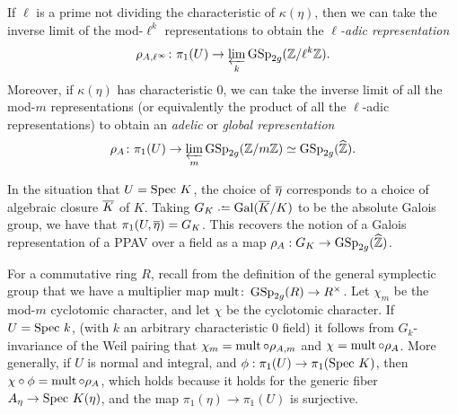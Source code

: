 If $\ell$ is a prime not dividing the characteristic of $\kappa(\eta)$, then we can take the inverse limit of the mod-$\ell^k$ representations to obtain the \emph{$\ell$-adic representation}
\begin{equation}\label{itsladicguys}
\rho_{A,\ell^\infty} \colon \pi_1(U) \to \varprojlim_k{\operatorname{GSp}_{2g}(\mathbb Z/\ell^k \mathbb Z)}.
\end{equation}
Moreover, if $\kappa(\eta)$ has characteristic $0$, we can take the inverse limit of all the mod-$m$ representations (or equivalently the product of all the $\ell$-adic representations) to obtain an \emph{adelic} or \emph{global representation}
\begin{equation}\label{thisisthepartofme}
	\rho_A \colon \pi_1(U) \to \varprojlim_m {\operatorname{GSp}_{2g}(\mathbb Z/m \mathbb Z)} \simeq \operatorname{GSp}_{2g}(\widehat{\mathbb Z}).
\end{equation}
\vspace*{-0.2in}
\begin{remark}
In the situation that $U = \text{Spec } K$, the choice of $\overline{\eta}$ corresponds to a choice of algebraic closure $\overline{K}$ of $K$. Taking $G_K \defeq \Gal(\ol{K}/K)$ to be the absolute Galois group, we have that $\pi_1(U, \overline{\eta}) = G_K$. This recovers the notion of a Galois representation of a PPAV over a field as a map $\rho_A: G_K \rightarrow \operatorname{GSp}_{2g}(\widehat{\mathbb Z})$.
\end{remark}
\vspace*{-0.1in}
\begin{remark}
	\label{remark:det-rho-is-chi}
For a commutative ring $R$, recall from the definition of the general symplectic group that we have a multiplier map $\operatorname{mult} \colon \operatorname{GSp}_{2g}(R) \to R^\times$. Let $\chi_m$ be the mod-$m$ cyclotomic character, and let $\chi$ be the cyclotomic character. If $U = \text{Spec } k$, (with $k$ an arbitrary characteristic $0$ field) it follows from $G_k$-invariance of the Weil pairing that $\chi_m = \operatorname{mult} \circ \rho_{A,m}$ and $\chi = \operatorname{mult} \circ \rho_{A}$.
More generally, if $U$ is normal and integral, and $\phi: \pi_1(U) \rightarrow \pi_1(\text{Spec } K)$, then
$\chi \circ \phi = \operatorname{mult} \circ \rho_A$,
which holds because it holds for the generic fiber $A_\eta \rightarrow \text{Spec } K(\eta)$, and the map $\pi_1(\eta) \rightarrow \pi_1(U)$ is surjective.
\end{remark}


